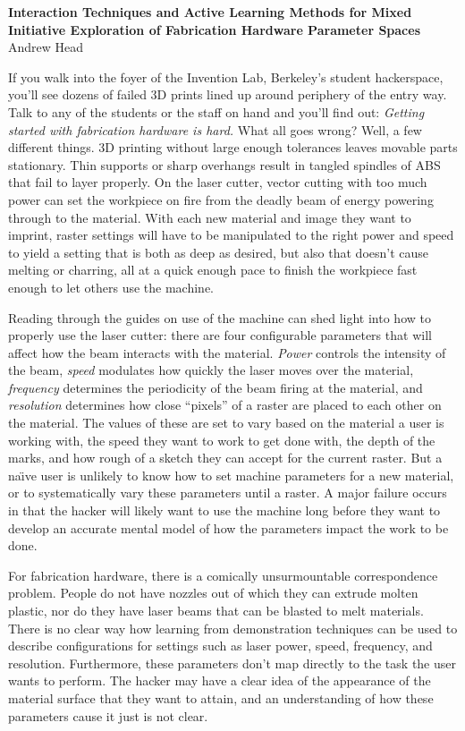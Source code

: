 \documentclass[12pt]{memoir}
\begin{document}

\begin{center}
  \textbf{Interaction Techniques and Active Learning Methods for Mixed Initiative Exploration of Fabrication Hardware Parameter Spaces}\\
  \vspace{.5em}
  Andrew Head
\end{center}

If you walk into the foyer of the Invention Lab, Berkeley's student hackerspace, you'll see dozens of failed 3D prints lined up around periphery of the entry way.
Talk to any of the students or the staff on hand and you'll find out:
\emph{Getting started with fabrication hardware is hard.}
What all goes wrong?
Well, a few different things.
3D printing without large enough tolerances leaves movable parts stationary.
Thin supports or sharp overhangs result in tangled spindles of ABS that fail to layer properly.
On the laser cutter, vector cutting with too much power can set the workpiece on fire from the deadly beam of energy powering through to the material.
With each new material and image they want to imprint, raster settings will have to be manipulated to the right power and speed to yield a setting that is both as deep as desired, but also that doesn't cause melting or charring, all at a quick enough pace to finish the workpiece fast enough to let others use the machine.

Reading through the guides on use of the machine can shed light into how to properly use the laser cutter:
there are four configurable parameters that will affect how the beam interacts with the material.
\emph{Power} controls the intensity of the beam, \emph{speed} modulates how quickly the laser moves over the material, \emph{frequency} determines the periodicity of the beam firing at the material, and \emph{resolution} determines how close ``pixels'' of a raster are placed to each other on the material.
The values of these are set to vary based on the material a user is working with, the speed they want to work to get done with, the depth of the marks, and how rough of a sketch they can accept for the current raster.
But a na\"{\i}ve user is unlikely to know how to set machine parameters for a new material, or to systematically vary these parameters until a raster.
A major failure occurs in that the hacker will likely want to use the machine long before they want to develop an accurate mental model of how the parameters impact the work to be done.

For fabrication hardware, there is a comically unsurmountable correspondence problem.
People do not have nozzles out of which they can extrude molten plastic, nor do they have laser beams that can be blasted to melt materials.
There is no clear way how learning from demonstration techniques can be used to describe configurations for settings such as laser power, speed, frequency, and resolution.
Furthermore, these parameters don't map directly to the task the user wants to perform.
The hacker may have a clear idea of the appearance of the material surface that they want to attain, and an understanding of how these parameters cause it just is not clear.
\end{document}
